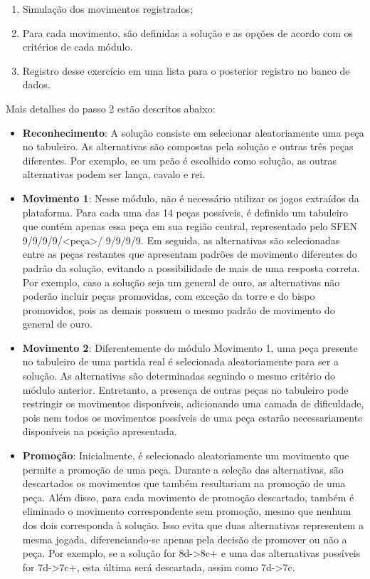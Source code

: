     \begin{enumerate}
        \item Simulação dos movimentos registrados;
        \item Para cada movimento, são definidas a solução e as opções de acordo com os critérios de cada módulo.
        \item Registro desse exercício em uma lista para o posterior registro no banco de dados.
    \end{enumerate}

    Mais detalhes do passo 2 estão descritos abaixo:

    \begin{itemize}
        \item \textbf{Reconhecimento}:
        A solução consiste em selecionar aleatoriamente uma peça no tabuleiro. As alternativas são compostas pela solução e outras três peças diferentes. Por exemplo, se um peão é escolhido como solução, as outras alternativas podem ser lança, cavalo e rei.
        \item \textbf{Movimento 1}: Nesse módulo, não é necessário utilizar os jogos extraídos da plataforma. Para cada uma das 14 peças possíveis, é definido um tabuleiro que contém apenas essa peça em sua região central, representado pelo SFEN 9/9/9/9/<peça>/ 9/9/9/9. Em seguida, as alternativas são selecionadas entre as peças restantes que apresentam padrões de movimento diferentes do padrão da solução, evitando a possibilidade de mais de uma resposta correta. Por exemplo, caso a solução seja um general de ouro, as alternativas não poderão incluir peças promovidas, com exceção da torre e do bispo promovidos, pois as demais possuem o mesmo padrão de movimento do general de ouro.
        \item \textbf{Movimento 2}: Diferentemente do módulo Movimento 1, uma peça presente no tabuleiro de uma partida real é selecionada aleatoriamente para ser a solução. As alternativas são determinadas seguindo o mesmo critério do módulo anterior. Entretanto, a presença de outras peças no tabuleiro pode restringir os movimentos disponíveis, adicionando uma camada de dificuldade, pois nem todos os movimentos possíveis de uma peça estarão necessariamente disponíveis na posição apresentada.  
        \item \textbf{Promoção}: Inicialmente, é selecionado aleatoriamente um movimento que permite a promoção de uma peça. Durante a seleção das alternativas, são descartados os movimentos que também resultariam na promoção de uma peça. Além disso, para cada movimento de promoção descartado, também é eliminado o movimento correspondente sem promoção, mesmo que nenhum dos dois corresponda à solução. Isso evita que duas alternativas representem a mesma jogada, diferenciando-se apenas pela decisão de promover ou não a peça. Por exemplo, se a solução for 8d->8c+ e uma das alternativas possíveis for 7d->7c+, esta última será descartada, assim como 7d->7c.

\end{itemize}
